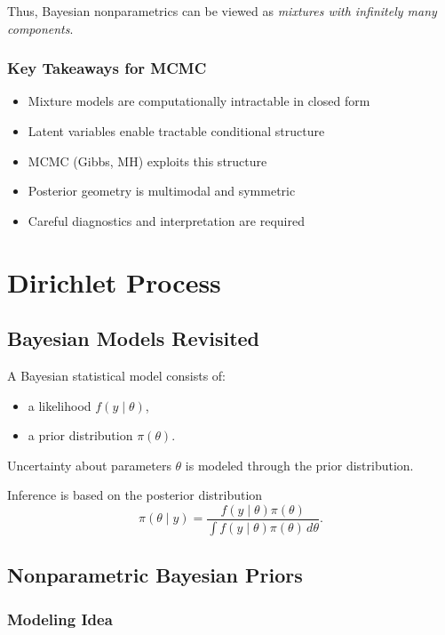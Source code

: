 \documentclass[12pt,oneside]{book}
\numberwithin{equation}{section}
\theoremstyle{definition}
\theoremstyle{plain}
\theoremstyle{remark}
\begin{document}
Thus, Bayesian nonparametrics can be viewed as \emph{mixtures with infinitely many components}.  

\subsection*{Key Takeaways for MCMC}

\begin{itemize}
\item Mixture models are computationally intractable in closed form
\item Latent variables enable tractable conditional structure
\item MCMC (Gibbs, MH) exploits this structure
\item Posterior geometry is multimodal and symmetric
\item Careful diagnostics and interpretation are required
\end{itemize}

\chapter{Dirichlet Process}

\section*{Bayesian Models Revisited}

A Bayesian statistical model consists of:

\begin{itemize}
\item a likelihood $f(y \mid \theta)$,
\item a prior distribution $\pi(\theta)$.
\end{itemize}

Uncertainty about parameters $\theta$ is modeled through the prior distribution.

Inference is based on the posterior distribution
\[
\pi(\theta \mid y)
=
\frac{f(y \mid \theta)\pi(\theta)}{\int f(y \mid \theta)\pi(\theta)\, d\theta}.
\]

\section{Nonparametric Bayesian Priors}

\subsection*{Modeling Idea}
\end{document}
